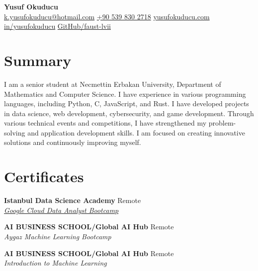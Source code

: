 \documentclass[10pt,a4paper]{extarticle}
\begin{document}
\begin{center}
    \begin{minipage}{\textwidth}
        \centering
        {\LARGE\textbf{Yusuf Okuducu}}\\[20pt]
        \href{mailto:k.yusufokuducu@hotmail.com}{k.yusufokuducu@hotmail.com} \quad
        \href{tel:+905398302718}{+90 539 830 2718} \quad
        \href{https://yusufokuducu.com}{yusufokuducu.com} \quad
        \href{https://linkedin.com/in/yusufokuducu}{in/yusufokuducu} \quad
        \href{https://github.com/faust-lvii}{GitHub/faust-lvii}
    \end{minipage}
\end{center}

\vspace{10pt}

\section{Summary}
I am a senior student at Necmettin Erbakan University, Department of Mathematics
and Computer Science. I have experience in various programming languages,
including Python, C, JavaScript, and Rust. I have developed projects in data science,
web development, cybersecurity, and game development. Through various technical
events and competitions, I have strengthened my problem-solving and application
development skills. I am focused on creating innovative solutions and continuously
improving myself.

\vspace{10pt}

\section{Certificates}
\textbf{Istanbul Data Science Academy} \hfill Remote\\
\textit{\href{https://istdatascience.com/certificate/DABYO237.pdf}{Google Cloud Data Analyst Bootcamp}}

\vspace{5pt}
\noindent\textbf{AI BUSINESS SCHOOL/Global AI Hub} \hfill Remote\\
\textit{Aygaz Machine Learning Bootcamp}

\vspace{5pt}
\noindent\textbf{AI BUSINESS SCHOOL/Global AI Hub} \hfill Remote\\
\textit{Introduction to Machine Learning}

\vspace{10pt}
\end{document}
